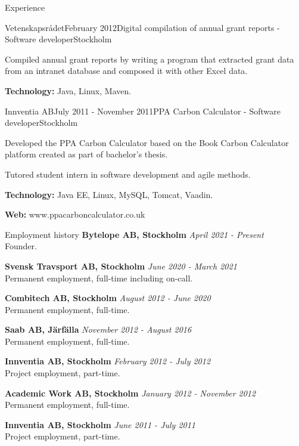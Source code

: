 \documentclass{resume}
\begin{document}
\begin{rSection}{Experience}
    \begin{rSubsection}{Vetenskapsrådet}{February 2012}{Digital compilation of annual grant reports - Software developer}{Stockholm}
      \item Compiled annual grant reports by writing a program that extracted grant data from an intranet database and composed it with other Excel data.
      \item \textbf{Technology:} Java, Linux, Maven.
    \end{rSubsection}

    \begin{rSubsection}{Innventia AB}{July 2011 - November 2011}{PPA Carbon Calculator - Software developer}{Stockholm}
      \item Developed the PPA Carbon Calculator based on the Book Carbon Calculator platform created as part of bachelor's thesis.
      \item Tutored student intern in software development and agile methods.
      \item \textbf{Technology:}  Java EE, Linux, MySQL, Tomcat, Vaadin.
      \item \textbf{Web:} www.ppacarboncalculator.co.uk
    \end{rSubsection}
  \end{rSection}

  \newpage
  \begin{rSection}{Employment history}
  	{\bf Bytelope AB, Stockholm}
    \hfill {\em April 2021 - Present } \\
    { Founder. }
    
  	{\bf Svensk Travsport AB, Stockholm}
    \hfill {\em June 2020 - March 2021 } \\
    { Permanent employment, full-time including on-call. }

    {\bf Combitech AB, Stockholm}
    \hfill {\em August 2012 - June 2020 } \\
    { Permanent employment, full-time. }

    {\bf Saab AB, Järfälla}
    \hfill {\em November 2012 - August 2016 } \\
    { Permanent employment, full-time. }

    {\bf Innventia AB, Stockholm}
    \hfill {\em February 2012 - July 2012 } \\
    { Project employment, part-time. }

    {\bf Academic Work AB, Stockholm}
    \hfill {\em January 2012 - November 2012 } \\
    { Permanent employment, full-time. }

    {\bf Innventia AB, Stockholm}
    \hfill {\em June 2011 - July 2011 } \\
    { Project employment, part-time. }
  \end{rSection}
\end{document}
